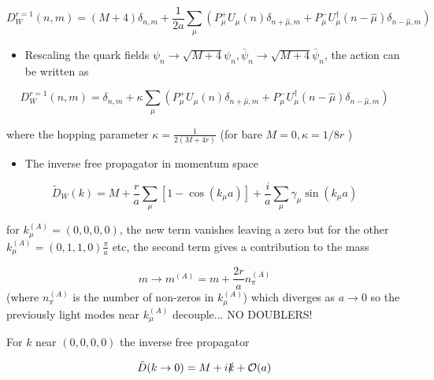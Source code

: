 \begin{equation}
D_{W}^{r=1}(n, m)=(M+4) \delta_{n, m}+\frac{1}{2 a} \sum_{\mu}\left(P_{\mu}^{+} U_{\mu}(n) \delta_{n+\hat{\mu}, m}+P_{\mu}^-U_{\mu}^{\dagger}(n-\hat{\mu}) \delta_{n-\hat{\mu}, m}\right)
\end{equation}

\begin{itemize}
  \item Rescaling the quark fields \(\psi_{n} \rightarrow \sqrt{M+4} \psi_{n}, \bar{\psi}_{n} \rightarrow \sqrt{M+4} \bar{\psi}_{n}\), the action can be written as
\end{itemize}

\begin{equation}
    \boxed{D_W^{r=1}(n,m) = \delta_{n,m} + \kappa \sum_\mu (P_\mu^+ U_\mu(n)\delta_{n + \hat{\mu}, m} + P_\mu^{-}U^\dagger_\mu(n - \hat{\mu}) \delta_{n - \hat{\mu}, m})}
\end{equation}

where the hopping parameter \(\kappa=\frac{1}{2(M+4 r)}\) (for bare \(M=0, \kappa=1 / 8 r\) )

\begin{itemize}
  \item The inverse free propagator in momentum space
\end{itemize}

\begin{equation}
\widetilde{D}_W(k)=M+\frac{r}{a} \sum_{\mu}\left[1-\cos \left(k_{\mu} a\right)\right]+\frac{i}{a} \sum_{\mu} \gamma_{\mu} \sin \left(k_{\mu} a\right)
\end{equation}

for \(k_{\mu}^{(A)}=(0,0,0,0)\), the new term vanishes leaving a zero but for the other \(k_{\mu}^{(A)}=(0,1,1,0) \frac{\pi}{a}\) etc, the second term gives a contribution to the mass

\begin{equation}
m \rightarrow m^{(A)}=m+\frac{2 r}{a} n_{\pi}^{(A)} 
\end{equation}
(where $n_{\pi}^{(A)}$ is the number of non-zeros in $k_{\mu}^{(A)}$)
which diverges as $a \rightarrow 0$ so the previously light modes near $k_\mu^{(A)}$ decouple... NO DOUBLERS!

For \(k\) near \((0,0,0,0)\) the inverse free propagator

\begin{equation}
\tilde{D}(k \rightarrow 0)=M+i \slashed{k}+\mathcal{O}(a)
\end{equation}

